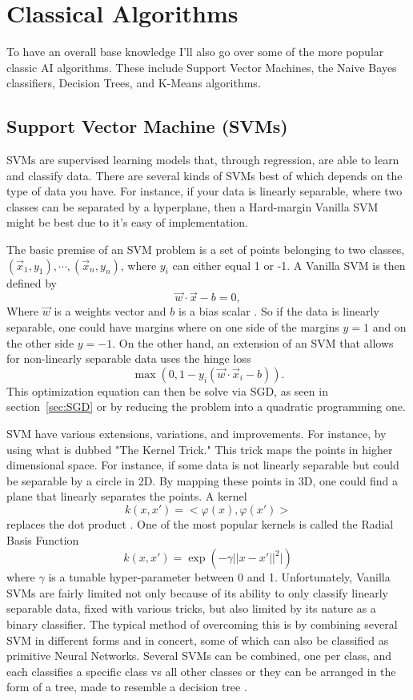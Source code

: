 \section{Classical Algorithms}

To have an overall base knowledge I'll also go over some of the more popular classic AI algorithms. These include Support Vector Machines, the Naive Bayes classifiers, Decision Trees, and K-Means algorithms.

\subsection{Support Vector Machine (SVMs)}

SVMs are supervised learning models that, through regression, are able to learn and classify data. There are several kinds of SVMs best of which depends on the type of data you have. For instance, if your data is linearly separable, where two classes can be separated by a hyperplane, then a Hard-margin Vanilla SVM might be best due to it's easy of implementation. 

The basic premise of an SVM problem is a set of points belonging to two classes, $(\vec{x}_1, y_1),\cdots, (\vec{x}_n, y_n)$, where $y_i$ can either equal 1 or -1. A Vanilla SVM is then defined by $$\vec{w}\cdot \vec{x}-b=0,$$ Where $\vec{w}$ is a weights vector and $b$ is a bias scalar \cite{cortes_vapnik_1995}. So if the data is linearly separable, one could have margins where on one side of the margins $y=1$ and on the other side $y=-1$. On the other hand, an extension of an SVM that allows for non-linearly separable data uses the hinge loss $$\max(0, 1-y_i(\vec{w}\cdot \vec{x}_i-b)).$$ This optimization equation can then be solve via SGD, as seen in section~\ref{sec:SGD} or by reducing the problem into a quadratic programming one. 

SVM have various extensions, variations, and improvements. For instance, by using what is dubbed "The Kernel Trick." This trick maps the points in higher dimensional space. For instance, if some data is not linearly separable but could be separable by a circle in 2D. By mapping these points in 3D, one could find a plane that linearly separates the points. A kernel $$k(x, x')=<\varphi(x), \varphi(x')>$$ replaces the dot product \cite{hofmann_scholkopf_smola_2008}. One of the most popular kernels is called the Radial Basis Function $$k(x, x')=\exp(-\gamma ||x-x'||^2|)$$ where $\gamma$ is a tunable hyper-parameter between 0 and 1. Unfortunately, Vanilla SVMs are fairly limited not only because of its ability to only classify linearly separable data, fixed with various tricks, but also limited by its nature as a binary classifier. The typical method of overcoming this is by combining several SVM in different forms and in concert, some of which can also be classified as primitive Neural Networks. Several SVMs can be combined, one per class, and each classifies a specific class vs all other classes or they can be arranged in the form of a tree, made to resemble a decision tree \cite{xu_lu_zou_2015}.


